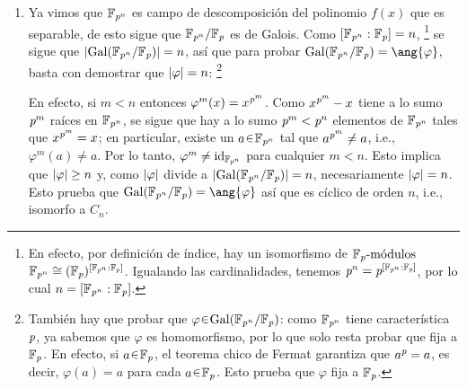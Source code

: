 \begin{sol}
\begin{enumerate}[label=\alph*)]
\item 
Ya vimos que $\mathbb{F}_{\operatorname{\textit{p}}^n}$ es campo de descomposición del polinomio $f(x)$ que es separable, de esto sigue que $\mathbb{F}_{\operatorname{\textit{p}}^n}/\mathbb{F}_{\operatorname{\textit{p}}}$ es de Galois. Como $[\mathbb{F}_{\operatorname{\textit{p}}^n}:\mathbb{F}_{\operatorname{\textit{p}}}] = n$,%
\footnote{
    En efecto, por definición de índice, hay un isomorfismo de $\mathbb{F}_{\operatorname{\textit{p}}}\text{-módulos}$ $\mathbb{F}_{\operatorname{\textit{p}}^n} \cong (\mathbb{F}_{\operatorname{\textit{p}}})^{[\mathbb{F}_{\operatorname{\textit{p}}^n}:\mathbb{F}_{\operatorname{\textit{p}}}]}$. Igualando las cardinalidades, tenemos $\operatorname{\textit{p}}^n = \operatorname{\textit{p}}^{[\mathbb{F}_{\operatorname{\textit{p}}^n}:\mathbb{F}_{\operatorname{\textit{p}}}]}$, por lo cual $n = [\mathbb{F}_{\operatorname{\textit{p}}^n}:\mathbb{F}_{\operatorname{\textit{p}}}]$.
}
se sigue que $\abs{\operatorname{Gal}(\mathbb{F}_{\operatorname{\textit{p}}^n}/\mathbb{F}_{\operatorname{\textit{p}}})} = n$, así que para probar $\gal(\mathbb{F}_{\p^n}/\mathbb{F}_{\p}) = \ang{\varphi}$, basta con demostrar que $\abs{\varphi} = n$:%
\footnote{
    También hay que probar que $\varphi \en \gal(\mathbb{F}_{\p^n}/\mathbb{F}_{\p})$: como $\mathbb{F}_{\operatorname{\textit{p}}^n}$ tiene característica $\operatorname{\textit{p}}$, ya sabemos que $\varphi$ es homomorfismo, por lo que solo resta probar que fija a $\mathbb{F}_{\operatorname{\textit{p}}}$. En efecto, si $a\en\mathbb{F}_{\p}$, el teorema chico de Fermat garantiza que $a^{\operatorname{\textit{p}}} = a$, es decir, $\varphi(a) = a$ para cada $a \en \mathbb{F}_{\p}$. Esto prueba que $\varphi$ fija a $\mathbb{F}_{\operatorname{\textit{p}}}$.
}
\par
En efecto, si $m<n$ entonces $\varphi^m(x) = x^{\operatorname{\textit{p}}^m}$. Como $x^{\operatorname{\textit{p}}^m} - x$ tiene a lo sumo $\operatorname{\textit{p}}^m$ raíces en $\mathbb{F}_{\operatorname{\textit{p}}^n}$, se sigue que hay a lo sumo $\operatorname{\textit{p}}^m<\operatorname{\textit{p}}^n$ elementos de $\mathbb{F}_{\operatorname{\textit{p}}^n}$ tales que $x^{\operatorname{\textit{p}}^m} = x$; en particular, existe un $a \en\mathbb{F}_{\p^n}$ tal que $a^{\operatorname{\textit{p}}^m} \neq a$, i.e., $\varphi^m(a) \neq a$. Por lo tanto, $\varphi^m \neq \operatorname{id}_{\mathbb{F}_{\operatorname{\textit{p}}^n}}$ para cualquier $m<n$. Esto implica que $\abs{\varphi} \geq n$ y, como $\abs{\varphi}$ divide a $\abs{\operatorname{Gal}(\mathbb{F}_{\operatorname{\textit{p}}^n}/\mathbb{F}_{\operatorname{\textit{p}}})} = n$, necesariamente $\abs{\varphi} = n$. Esto prueba que $\gal(\mathbb{F}_{\p^n}/\mathbb{F}_{\p}) = \ang{\varphi}$ así que es cíclico de orden $n$, i.e., isomorfo a $C_n$.


\end{enumerate}
\end{sol}
